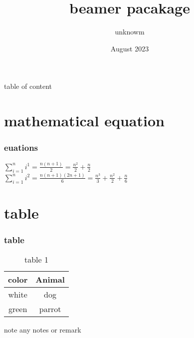 \documentclass{beamer}
\title{beamer pacakage}
\author{unknowm }
\date{August 2023}
\institute{keshav mahavidhayalya}
\begin{document}
\frame{\titlepage}
\begin{frame}{table of content}
    \tableofcontents
\end{frame}


\section{mathematical equation}
\begin{frame}
 \frametitle{euations}
 \blindtext[0-1]
 \begin{center}
     {$\sum_{i=1}^{n}i^1=\frac{n(n+1)}{2}=\frac{n^2}{2}+\frac{n}{2}$}\\
     {$\sum_{i=1}^{n}i^2=\frac{n(n+1)(2n+1)}{6}=\frac{n^3}{3}+\frac{n^2}{2}+\frac{n}{6}$}\\
 \end{center}
\end{frame}

\section{table}
\begin{frame}
   \frametitle{table} 
   \lipsum[0-1]
   \begin{table}
       \centering
       \begin{tabular}{|c|c|}
           \hline
          color  &  Animal \\
          \hline
          white  & dog \\
          \hline
          green & parrot\\
          \hline
       \end{tabular}
       \caption{table 1}
       \label{tab:my_label}
   \end{table}
   \begin{block}{note}
   any notes or remark
   \end{block}
\end{frame}
\end{document}
